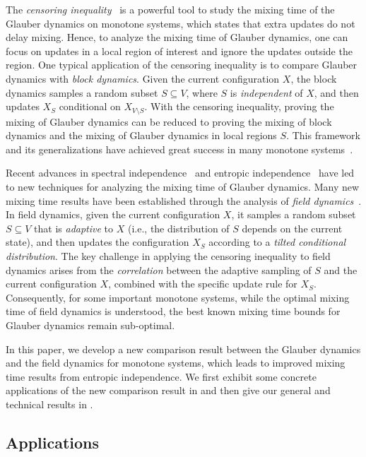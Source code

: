 \documentclass[11pt,a4paper]{article}
\theoremstyle{definition}
\begin{document}
The \emph{censoring inequality}~\cite{peres2013can,FillK13} is a powerful tool to study the mixing time of the Glauber dynamics on monotone systems, which states that extra updates do not delay mixing. Hence, to analyze the mixing time of Glauber dynamics, one can focus on updates in a local region of interest and ignore the updates outside the region. One typical application of the censoring inequality is to compare Glauber dynamics with \emph{block dynamics}. 
%
Given the current configuration $X$, the block dynamics samples a random subset $S\subseteq V$, where $S$ is \emph{independent} of $X$, and then updates $X_S$ conditional on $X_{V \setminus S}$. 
%
With the censoring inequality, proving the mixing of Glauber dynamics can be reduced to proving the mixing of block dynamics and the mixing of Glauber dynamics in local regions $S$.  
%
This framework and its generalizations have achieved great success in many monotone systems~\cite{ding2010mixing,MS13,BlancaCV20,BlancaZ23,BlancaG25}.

Recent advances in spectral independence~\cite{ALO21} and entropic independence~\cite{AJKPV22} have led to new techniques for analyzing the mixing time of Glauber dynamics. Many new mixing time results have been established through the analysis of \emph{field dynamics}~\cite{CFYZ21,CFYZ22,ChenE22,CZ23,Chen0Y23,chen2024rapid}. In field dynamics, given the current configuration $X$, it samples a random subset $S\subseteq V$ that is \emph{adaptive} to $X$ (i.e., the distribution of $S$ depends on the current state), and then updates the configuration $X_S$ according to a \emph{tilted conditional distribution}. The key challenge in applying the censoring inequality to field dynamics arises from the \emph{correlation} between the adaptive sampling of $S$ and the current configuration $X$, combined with the specific update rule for $X_S$. Consequently, for some important monotone systems, while the optimal mixing time of field dynamics is understood, the best known mixing time bounds for Glauber dynamics remain sub-optimal.

In this paper, we develop a new comparison result between the Glauber dynamics and the field dynamics for monotone systems, which leads to improved mixing time results from entropic independence.
We first exhibit some concrete applications of the new comparison result in  and then give our general and technical results in . 



\subsection{Applications}\label{sec:applications}
\end{document}

